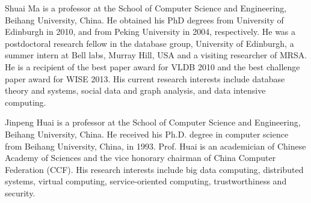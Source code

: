 \documentclass[10pt,journal,compsoc]{IEEEtran}
\begin{document}
\vspace{-4ex}
\begin{IEEEbiography}
{Shuai Ma} is a professor at the School of Computer Science and Engineering, Beihang University, China.
He obtained his PhD degrees from University of Edinburgh in 2010, and from
Peking University in 2004, respectively.
He was a postdoctoral research fellow in the database group, University of Edinburgh, a summer intern at Bell labs, Murray Hill, USA and a visiting researcher of MRSA.
He is a recipient of the best paper award for VLDB 2010 and the best challenge paper award for WISE 2013. His current research interests include database theory and systems, social data and graph analysis, and data intensive computing.
\end{IEEEbiography}
\vspace{-4ex}
\begin{IEEEbiography}
{Jinpeng Huai} is a professor at the School of Computer Science and Engineering, Beihang University, China. He received his Ph.D. degree in computer science from Beihang University, China, in 1993. Prof. Huai is an academician of Chinese Academy of Sciences and the vice honorary chairman of China Computer Federation (CCF). His research interests include big data computing, distributed systems, virtual computing, service-oriented computing, trustworthiness and security.
\end{IEEEbiography}

\end{document}
